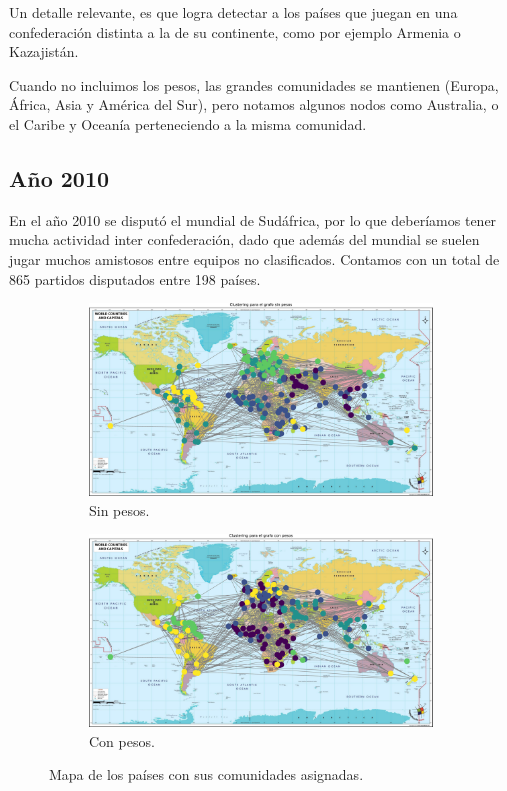 \documentclass{article}
\begin{document}
Un detalle relevante, es que logra detectar a los países que juegan en una confederación distinta a la 
de su continente, como por ejemplo Armenia o Kazajistán.

Cuando no incluimos los pesos, las grandes comunidades se mantienen (Europa, África, Asia y América del Sur),
pero notamos algunos nodos como Australia, o el Caribe y Oceanía perteneciendo a la misma comunidad.

\subsection{Año 2010}

En el año 2010 se disputó el mundial de Sudáfrica, por lo que deberíamos tener mucha actividad inter
confederación, dado que además del mundial se suelen jugar muchos amistosos entre equipos no clasificados.
Contamos con un total de 865 partidos disputados entre 198 países.

\begin{figure}[htb]
    \centering
    \begin{subfigure}{0.49\textwidth}
        \centering
        \includegraphics[width=\linewidth]{images/mapas/mapa_sin_pesos_2010.pdf}
        \caption{Sin pesos.}
        \label{fig:2010_sin_pesos}
    \end{subfigure}
    \begin{subfigure}{0.49\textwidth}
        \centering
        \includegraphics[width=\linewidth]{images/mapas/mapa_con_pesos_2010.pdf}
        \caption{Con pesos.}
        \label{fig:2010_con_pesos}
    \end{subfigure}
    \caption{Mapa de los países con sus comunidades asignadas.}
    \label{fig:mapa_2010}
\end{figure}
\end{document}
